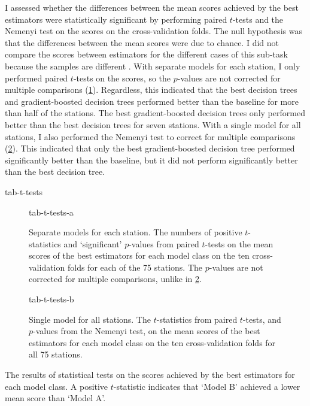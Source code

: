 I assessed whether the differences between the mean scores achieved by the best
estimators were statistically significant by performing paired $t$-tests and the
Nemenyi test on the scores on the cross-validation folds.
The null hypothesis was that the differences between the mean scores were due to
chance.
I did not compare the scores between estimators for the different cases of this
sub-task because the samples are different \parencite[354]{Flach2012}.
With separate models for each station, I only performed paired $t$-tests on the scores,
so the $p$-values are not corrected for multiple comparisons
(\cref{sub-task-1:tab-t-tests-a}).
Regardless, this indicated that the best decision trees and gradient-boosted decision
trees performed better than the baseline for more than half of the stations.
The best gradient-boosted decision trees only performed better than the best decision
trees for seven stations.
With a single model for all stations, I also performed the Nemenyi test to correct for
multiple comparisons (\cref{sub-task-1:tab-t-tests-b}).
This indicated that only the best gradient-boosted decision tree performed
significantly better than the baseline, but it did not perform significantly better
than the best decision tree.

{tab-t-tests}

\begin{table}
  \centering
  \begin{subfigure}{\textwidth}
    \centering
    {tab-t-tests-a}
    \caption{
      Separate models for each station.
      The numbers of positive $t$-statistics and `significant' $p$-values from paired
      $t$-tests on the mean scores of the best estimators for each model class on the ten
      cross-validation folds for each of the 75 stations.
      The $p$-values are not corrected for multiple comparisons, unlike in
      \cref{sub-task-1:tab-t-tests-b}.
    }
    \label{sub-task-1:tab-t-tests-a}
  \end{subfigure}
  \subfigurespace
  \begin{subfigure}{\textwidth}
    \centering
    {tab-t-tests-b}
    \caption{
      Single model for all stations.
      The $t$-statistics from paired $t$-tests, and $p$-values from the Nemenyi test, on the
      mean scores of the best estimators for each model class on the ten cross-validation
      folds for all 75 stations.
    }
    \label{sub-task-1:tab-t-tests-b}
  \end{subfigure}
  \caption{
    The results of statistical tests on the scores achieved by the best estimators for each model class.
    A positive $t$-statistic indicates that `Model B' achieved a lower mean score than
    `Model A'.
  }
  \label{sub-task-1:tab-t-tests}
\end{table}
